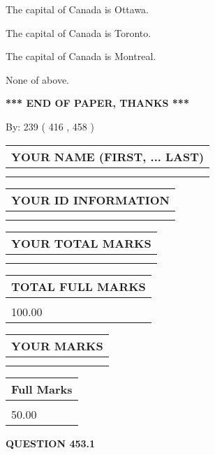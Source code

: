 \documentclass[12pt]{article}
\begin{document}
  
 
 
The capital of Canada is Ottawa.
 
 
The capital of Canada is Toronto.
 
 
The capital of Canada is Montreal.
 
 
 None of above.
 
 
   
   
\vspace{1.0in} 
{\textbf{\large{ *** END OF PAPER, THANKS *** }}} 
   
   
\hspace{1.0in} By: 
 239 ( 416 ,  458 )
   
   
   
   
\newpage 
\setcounter{page}{ 
   453001 } 
   
   
   
   
\noindent\begin{tabular}{|l|}
\hline
YOUR NAME (FIRST, ... LAST)  \\
\hline
 \\ 
 \\ 
\hline
\end{tabular}
\hspace{0.05in} \begin{tabular}{|l|}
\hline
 YOUR   ID   INFORMATION  \\
\hline
 \\ 
 \\ 
\hline
\end{tabular}
   
   
\vspace{0.2in}\noindent\begin{tabular}{|l|}
\hline
YOUR TOTAL MARKS  \\
\hline
 \\ 
 \\ 
\hline
\end{tabular}
\hspace{0.05in} \begin{tabular}{|l|}
\hline
TOTAL FULL MARKS  \\
\hline
 \\ 
100.00 \\
\hline
\end{tabular}
  
\vspace{0.2in}
  
\noindent\begin{tabular}{|l|}
\hline
 YOUR MARKS  \\
\hline
 \\ 
 \\ 
\hline
\end{tabular}
\hspace{0.05in} \begin{tabular}{|l|}
\hline
 Full Marks  \\
\hline
 \\ 
50.00 \\
\hline
\end{tabular}
{\textbf{\Large{QUESTION
453.1 
}}}
  
\end{document}
